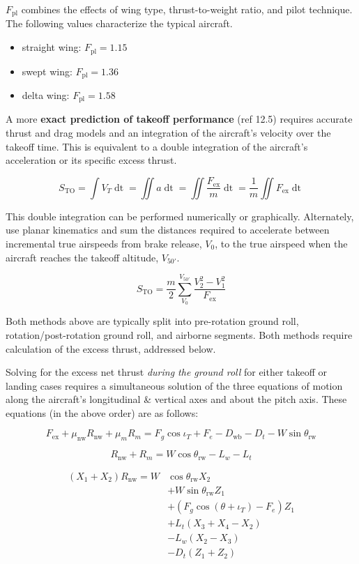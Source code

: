 \documentclass[
]{book}
\providecommand{\tightlist}{%
  \setlength{\itemsep}{0pt}\setlength{\parskip}{0pt}}
\begin{document}
\(F_{\text{pl}}\) combines the effects of wing type, thrust-to-weight ratio, and pilot technique.
The following values characterize the typical aircraft.

\begin{itemize}
\tightlist
\item
  straight wing: \(F_{\text{pl}} = 1.15\)
\item
  swept wing: \(F_{\text{pl}} = 1.36\)
\item
  delta wing: \(F_{\text{pl}} = 1.58\)
\end{itemize}

A more \textbf{exact prediction of takeoff performance} (ref 12.5) requires accurate thrust and drag models and an integration of the aircraft's velocity over the takeoff time.
This is equivalent to a double integration of the aircraft's acceleration or its specific excess thrust.

\[
S_{\mathrm{TO}} = \int V_T \mathop{dt} = \iint a \mathop{dt} = \iint \frac{F_{\text{ex}}}{m} \mathop{dt} = \frac{1}{m} \iint F_{\text{ex}} \mathop{dt}
\label{eq:s-to-fpl-exact}
\]

This double integration can be performed numerically or graphically.
Alternately, use planar kinematics and sum the distances required to accelerate between incremental true airspeeds from brake release, \(V_0\), to the true airspeed when the aircraft reaches the takeoff altitude, \(V_{50'}\).

\[
S_{\mathrm{TO}} = \frac{m}{2} \sum_{V_0}^{V_{50'}} \frac{V_2^2 - V_1^2}{F_{\text{ex}}}
\label{eq:to-dist}
\]

Both methods above are typically split into pre-rotation ground roll, rotation/post-rotation ground roll, and airborne segments.
Both methods require calculation of the excess thrust, addressed below.

Solving for the excess net thrust \emph{during the ground roll} for either takeoff or landing cases requires a simultaneous solution of the three equations of motion along the aircraft's longitudinal \& vertical axes and about the pitch axis.
These equations (in the above order) are as follows:

\[
F_{\text{ex}}+ \mu_{\text{nw}} R_{\text{nw}} + \mu_m R_m = F_g \cos \iota_T + F_e - D_{\text{wb}} - D_t - W \sin \theta_{\text{rw}}
\label{eq:eom-x}
\]

\[
R_{\text{nw}} + R_m = W \cos \theta_{\text{rw}} - L_w - L_t
\label{eq:eom-z}
\]

\[
\begin{split}
\left( X_1 + X_2 \right) R_{\text{nw}} = W& \cos \theta_{\text{rw}} X_2 \\
&+ W \sin \theta_{\text{rw}} Z_1 \\
&+ \left( F_g \cos \left( \theta + \iota_T \right) - F_e \right) Z_1 \\
&+ L_t \left( X_3 + X_4 - X_2 \right) \\&- L_w \left( X_2 - X_3 \right) \\
&- D_t \left( Z_1 + Z_2 \right)
\end{split}
\label{eq:eom-pitch}
\]
\end{document}
